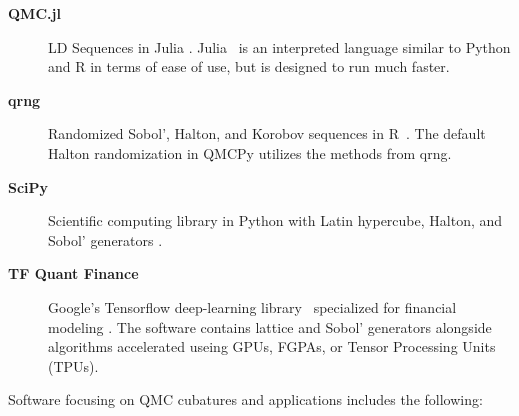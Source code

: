 \documentclass[graybox]{svmult}
\begin{document}
\begin{description}
	\item[\textbf{QMC.jl}] LD Sequences in Julia \cite{Rob20a}. Julia~\cite{bezanson2012julia} is an interpreted language similar to Python and R in terms of ease of use, but is designed to run much faster.
	\item[\textbf{qrng}] Randomized Sobol', Halton, and Korobov sequences in R~\cite{QRNG2020}. The default Halton randomization in QMCPy utilizes the methods from qrng. 
	\item[\textbf{SciPy}] Scientific computing library in Python with Latin hypercube,  Halton, and Sobol' generators \cite{2020SciPy-NMeth}.
	\item[\textbf{TF Quant Finance}] Google's Tensorflow  deep-learning library~\cite{tensorflow2015-whitepaper} specialized for financial modeling \cite{tfqf21}. The software contains lattice and Sobol' generators alongside algorithms accelerated useing GPUs, FGPAs, or Tensor Processing Units (TPUs).%
\end{description}
Software focusing on QMC cubatures and applications includes the following:
\end{document}
